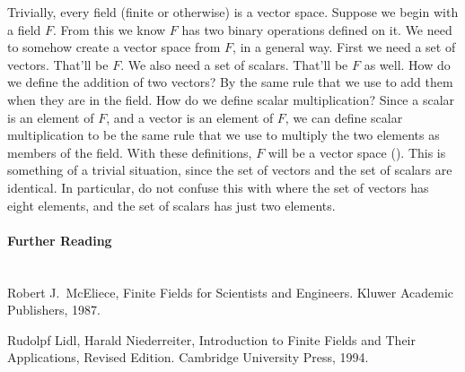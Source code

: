 %
Trivially, every field (finite or otherwise) is a vector space.  Suppose we begin with a field $F$.  From this we know $F$ has two binary operations defined on it.  We need to somehow create a vector space from $F$, in a general way.  First we need a set of vectors.  That'll be $F$.  We also need a set of scalars.  That'll be $F$ as well.  How do we define the addition of two vectors?  By the same rule that we use to add them when they are in the field.  How do we define scalar multiplication?  Since a scalar is an element of $F$, and a vector is an element of $F$, we can define scalar multiplication to be the same rule that we use to multiply the two elements as members of the field.  With these definitions, $F$ will be a vector space ().  This is something of a trivial situation, since the set of vectors and the set of scalars are identical.  In particular, do not confuse this with  where the set of vectors has eight elements, and the set of scalars has just two elements.
%
\paragraph{Further Reading}\ \\
%
Robert J.\ McEliece, Finite Fields for Scientists and Engineers. Kluwer Academic Publishers, 1987.\par
%
Rudolpf Lidl, Harald Niederreiter, Introduction to Finite Fields and Their Applications, Revised Edition.  Cambridge University Press, 1994.
%
%




